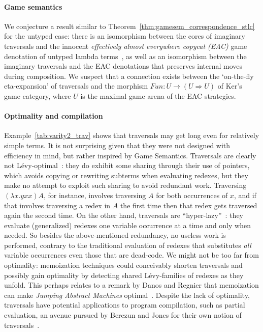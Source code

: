 \documentclass{elsarticle}
\theoremstyle{plain}
\theoremstyle{definition}
\begin{document}
\paragraph{Game semantics} We conjecture a result similar
to Theorem~\ref{thm:gamesem_correspondence_stlc} for
the untyped case: there is an isomorphism between the cores of imaginary traversals and the innocent \emph{effectively almost everywhere copycat (EAC)} game denotation of untyped lambda terms~\cite{KerThesis}, as well as an isomorphism between the imaginary traversals and the EAC denotations that preserves internal moves during composition. We suspect that a connection exists between the `on-the-fly eta-expansion' of traversals and the morphism $Fun : U \rightarrow (U \Rightarrow U)$ of Ker's game category, where $U$ is the maximal game arena of the EAC strategies.

\paragraph{Optimality and compilation}
Example~\ref{tab:varity2_trav} shows that traversals may get long even for relatively simple terms. It is not surprising given that they were not designed with efficiency in mind, but rather inspired by Game Semantics.
Traversals are clearly not L\'evy-optimal~\cite{optimal-reduction-levy}: they do exhibit some sharing through their use of pointers, which avoids copying or rewriting subterms when evaluating redexes, but they make no attempt to exploit such sharing to avoid redundant work.
Traversing $(\lambda x. y x x) A$, for instance, involves traversing $A$ for both occurrences of $x$, and if that involves traversing a redex in $A$ the first time then that redex gets traversed again the second time. %
%
On the other hand, traversals are  ``hyper-lazy''~\cite{danosherbelinregnier1996}: they evaluate (generalized) redexes one variable occurrence at a time and only when needed. So besides the above-mentioned  redundancy, no useless work is performed, contrary to the traditional
evaluation of redexes that substitutes \emph{all} variable occurrences even those that are dead-code.
%
We might not be too far from optimality:
memoization techniques could conceivably shorten traversals
and possibly gain optimality
by detecting shared L\'evy-families of redexes as they unfold.
This perhaps relates to a remark by Danos and Regnier that memoization
can make \emph{Jumping Abstract Machines} optimal~\cite{DANOS199979}.
%
Despite the lack of optimality, traversals have potential applications to program compilation, such as partial evaluation, an avenue pursued by Berezun and Jones
for their own notion of traversals~\cite{berezunjones_partialevalbytraversals}.
\end{document}
